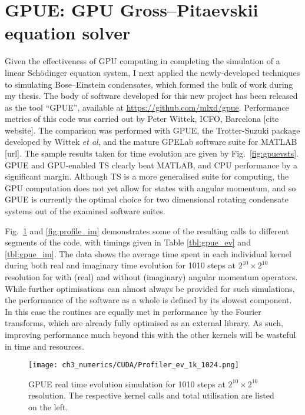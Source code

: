 \section{GPUE: GPU Gross--Pitaevskii equation solver}

Given the effectiveness of GPU computing in completing the simulation of a linear Sch\"odinger equation system, I next applied the newly-developed techniques to simulating Bose--Einstein condensates, which formed the bulk of work during my thesis. The body of software developed for this new project has been released as the tool ``GPUE'', available at \url{https://github.com/mlxd/gpue}. Performance metrics of this code was carried out by Peter Wittek, ICFO, Barcelona [cite website]. The comparison was performed with GPUE, the Trotter-Suzuki package developed by Wittek \textit{et al}, and the mature GPELab software suite for MATLAB [url]. The sample results taken for time evolution are given by Fig.~\ref{fig:gpuevsts}. GPUE and GPU-enabled TS clearly beat MATLAB, and CPU performance by a significant margin. Although TS is a more generalised suite for computing, the GPU computation does not yet allow for states with angular momentum, and so GPUE is currently the optimal choice for two dimensional rotating condensate systems out of the examined software suites.

Fig.~\ref{fig:profile_ev} and \ref{fig:profile_im} demonstrates some of the resulting calls to different segments of the code, with timings given in Table \ref{tbl:gpue_ev} and \ref{tbl:gpue_im}. The data shows the average time spent in each individual kernel during both real and imaginary time evolution for 1010 steps at $2^{10}\times 2^{10}$ resolution for with (real) and without (imaginary) angular momentum operators. While further optimisations can almost always be provided for such simulations, the performance of the software as a whole is defined by its slowest component. In this case the routines are equally met in performance by the Fourier transforms, which are already fully optimised as an external library. As such, improving performance much beyond this with the other kernels will be wasteful in time and resources.

\begin{figure}
    \centering
    \texttt{[image: ch3\_numerics/CUDA/Profiler\_ev\_1k\_1024.png]}
    \caption{GPUE real time evolution simulation for 1010 steps at $2^{10}\times 2^{10}$ resolution. The respective kernel calls and total utilisation are listed on the left.}
    \label{fig:profile_ev}
\end{figure}

